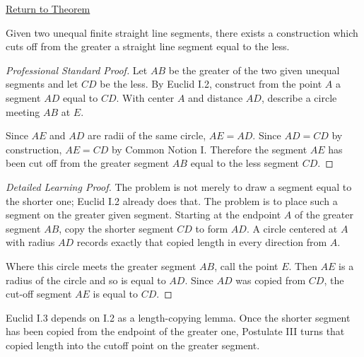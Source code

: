 \newpage
{}
\label{prf:euclid-i-3}

\begin{remark*}[Return]
\hyperref[thm:euclid-i-3]{Return to Theorem}
\end{remark*}

\begin{theorem*}
Given two unequal finite straight line segments, there exists a construction
which cuts off from the greater a straight line segment equal to the less.
\end{theorem*}

\begin{proof}[Professional Standard Proof]
\LRAProofBodyStart
Let $AB$ be the greater of the two given unequal segments and let $CD$ be the
less. By Euclid I.2, construct from the point $A$ a segment $AD$ equal to
$CD$. With center $A$ and distance $AD$, describe a circle meeting $AB$ at
$E$.

Since $AE$ and $AD$ are radii of the same circle, $AE=AD$. Since $AD=CD$ by
construction, $AE=CD$ by Common Notion I. Therefore the segment $AE$ has been
cut off from the greater segment $AB$ equal to the less segment $CD$.
\end{proof}

\begin{proof}[Detailed Learning Proof]
\LRAProofBodyStart


The problem is not merely to draw a segment equal to the shorter one; Euclid
I.2 already does that. The problem is to place such a segment on the greater
given segment. Starting at the endpoint $A$ of the greater segment $AB$, copy
the shorter segment $CD$ to form $AD$. A circle centered at $A$ with radius
$AD$ records exactly that copied length in every direction from $A$.

Where this circle meets the greater segment $AB$, call the point $E$. Then
$AE$ is a radius of the circle and so is equal to $AD$. Since $AD$ was copied
from $CD$, the cut-off segment $AE$ is equal to $CD$.
\end{proof}

\begin{remark*}
Euclid I.3 depends on I.2 as a length-copying lemma. Once the shorter segment
has been copied from the endpoint of the greater one, Postulate III turns that
copied length into the cutoff point on the greater segment.
\end{remark*}


